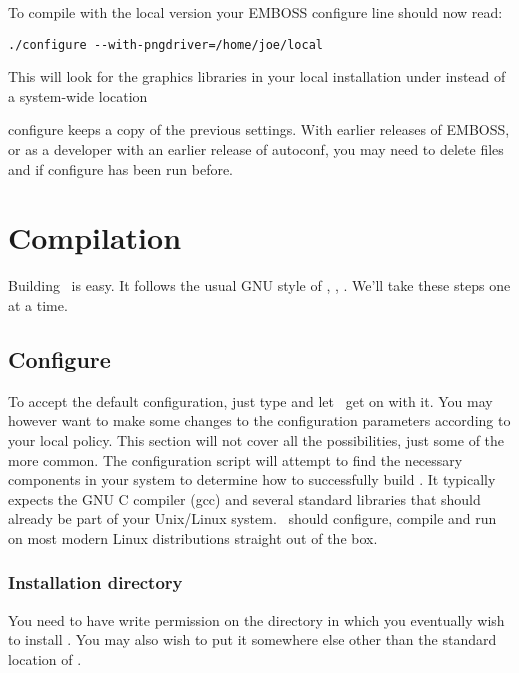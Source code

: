 \documentclass{report}
\begin{document}
To compile with the local version your EMBOSS configure line should
now read:

\begin{verbatim}
./configure --with-pngdriver=/home/joe/local
\end{verbatim}

This will look for the graphics libraries in your local installation
under  instead of a system-wide location

configure keeps a copy of the previous settings. With earlier releases
of EMBOSS, or as a developer with an earlier release of autoconf, you
may need to delete files  and
 if configure has been run before.

\section{Compilation}

Building \EMBOSS\ is easy. It follows the usual GNU style of
, , . We'll take
these steps one at a time.

\subsection{Configure}

To accept the default configuration, just type 
and let \EMBOSS\ get on with it. You may however want to make some
changes to the configuration parameters according to your local
policy. This section will not cover all the possibilities, just some
of the more common. The configuration script will attempt to find the
necessary components in your system to determine how to successfully
build \EMBOSS. It typically expects the GNU C compiler (gcc) and
several standard libraries that should already be part of your
Unix/Linux system. \EMBOSS\ should configure, compile and run on most
modern Linux distributions straight out of the box.


\subsubsection{Installation directory}

You need to have write permission on the directory in which you
eventually wish to install \EMBOSS. You may also wish to put it
somewhere else other than the standard location of
.
\end{document}
